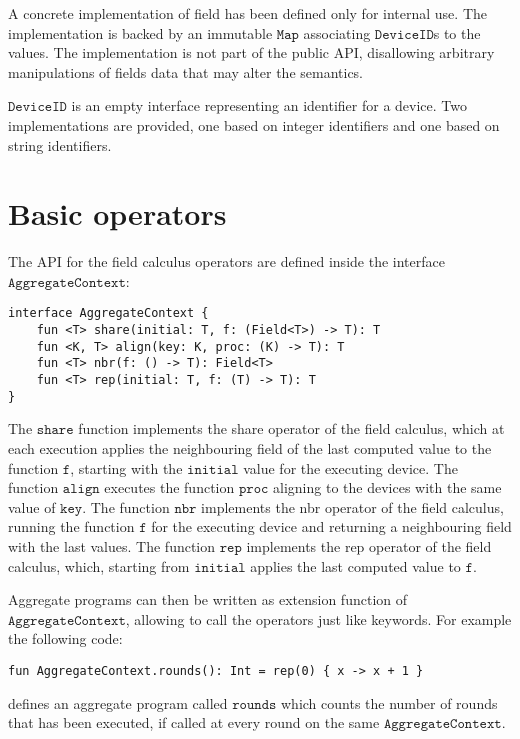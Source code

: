 A concrete implementation of field has been defined only for internal use. The implementation is backed by an immutable $\mathtt{Map}$ associating $\mathtt{DeviceID}$s to the values. The implementation is not part of the public API, disallowing arbitrary manipulations of fields data that may alter the semantics.

$\mathtt{DeviceID}$ is an empty interface representing an identifier for a device. Two implementations are provided, one based on integer identifiers and one based on string identifiers.

\section{Basic operators}

The API for the field calculus operators are defined inside the interface $\mathtt{AggregateContext}$:
\begin{lstlisting}[language={kotac}]
interface AggregateContext {
    fun <T> share(initial: T, f: (Field<T>) -> T): T
    fun <K, T> align(key: K, proc: (K) -> T): T
    fun <T> nbr(f: () -> T): Field<T>
    fun <T> rep(initial: T, f: (T) -> T): T
}
\end{lstlisting}
The $\mathtt{share}$ function implements the share operator of the field calculus, which at each execution applies the neighbouring field of the last computed value to the function $\mathtt{f}$, starting with the $\mathtt{initial}$ value for the executing device. The function $\mathtt{align}$ executes the function $\mathtt{proc}$ aligning to the devices with the same value of $\mathtt{key}$. The function $\mathtt{nbr}$ implements the nbr operator of the field calculus, running the function $\mathtt{f}$ for the executing device and returning a neighbouring field with the last values. The function $\mathtt{rep}$ implements the rep operator of the field calculus, which, starting from $\mathtt{initial}$ applies the last computed value to $\mathtt{f}$.

Aggregate programs can then be written as extension function of $\mathtt{AggregateContext}$, allowing to call the operators just like keywords. For example the following code:
\begin{lstlisting}[language={kotac}]
fun AggregateContext.rounds(): Int = rep(0) { x -> x + 1 }
\end{lstlisting}
defines an aggregate program called $\mathtt{rounds}$ which counts the number of rounds that has been executed, if called at every round on the same $\mathtt{AggregateContext}$.

